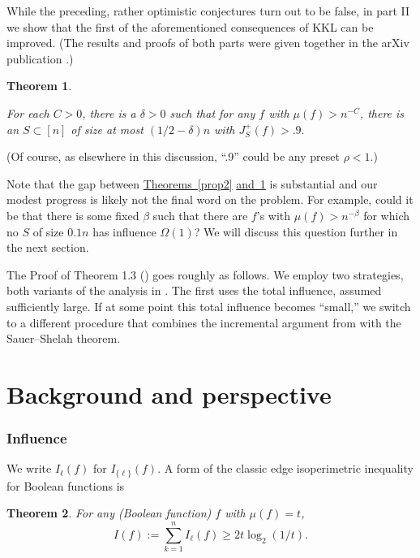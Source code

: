 \documentclass[11pt]{article}
\numberwithin{equation}{section}
\theoremstyle{definition}
\theoremstyle{plain}
\newcommand{\expref}[2]{\hyperref[#2]{#1~\ref{#2}}}
\newtheorem{thm}{Theorem}[section]
\newcommand{\nin}[0]{\noindent}
\newcommand{\0}[0]{\emptyset}
\newcommand{\gb}[0]{\beta }
\newcommand{\gO}[0]{\Omega}
\begin{document}
While the preceding, rather optimistic conjectures turn out to be false, 
in part II  we show
that the first of the aforementioned consequences of KKL can be 
improved. (The results and proofs of both parts were given together in
the arXiv publication \cite {BKK21}.) 
%
%

\noindent
\begin{thm}\label{prop3}

For each $C>0$, there is a $\delta>0$ such that for any $f$ with 
$\mu(f) >n^{-C}$, there
is an $S\subset [n]$ of size at most $(1/2-\delta)n$ with $J_{S}^{+}(f)>.9.$
\end {thm}
\nin
(Of course, as elsewhere in this discussion, ``.9'' could be any preset $\rho <1$.)

Note that the gap between \expref{Theorems}{prop2} \expref{and}{prop3} is substantial 
and our modest progress is likely not the final word on the problem.
For example, could it be that there is some fixed $\gb$ such that there
are $f$'s with %
%
%
$\mu(f) > n^{-\gb}$ for which no $S$ of size $0.1 n$ has influence $\gO(1)$?
We will discuss this question further in the next section.


%
%
%
The Proof of Theorem 1.3 (\cite {BKK21}) goes roughly as follows.
We employ two strategies, both variants of the analysis in \cite{kkl}.
The first 
uses the total influence, assumed sufficiently large.
If at some point this total influence becomes ``small,'' 
we switch to a different procedure that
combines the incremental argument from \cite{kkl} with the 
Sauer--Shelah %
theorem.  %

\section {Background and perspective}
\label{s:bac}

\subsubsection *{Influence}

We write $I_\ell (f)$ for $I_{\{\ell\}}(f)$.  A form of
the classic edge isoperimetric inequality for Boolean
functions is  
%

\begin{thm}\label{Tiso}
For any (Boolean function) $f$ %
%
 with $\mu(f) =t$,
\begin {equation}
\label {e:harper}
I(f) := \sum_{k=1}^n  I_\ell (f) \ge  2t \log_2 (1/t).
\end {equation}
\end {thm}
\end{document}
